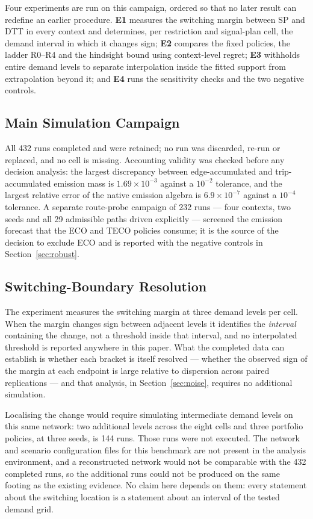 \documentclass[runningheads]{llncs}
\begin{document}
Four experiments are run on this campaign, ordered so that no later result can redefine an
earlier procedure. \textbf{E1} measures the switching margin between SP and DTT in every
context and determines, per restriction and signal-plan cell, the demand interval in which
it changes sign; \textbf{E2} compares the fixed policies, the ladder R0--R4 and the
hindsight bound using context-level regret; \textbf{E3} withholds entire demand levels to
separate interpolation inside the fitted support from extrapolation beyond it; and
\textbf{E4} runs the sensitivity checks and the two negative controls.

\subsection{Main Simulation Campaign}

All 432 runs completed and were retained; no run was discarded, re-run or replaced, and no
cell is missing. Accounting validity was checked before any decision analysis: the largest
discrepancy between edge-accumulated and trip-accumulated emission mass is
$1.69\times10^{-3}$ against a $10^{-2}$ tolerance, and the largest relative error of the
native emission algebra is $6.9\times10^{-7}$ against a $10^{-4}$ tolerance. A separate
route-probe campaign of 232 runs --- four contexts, two seeds and all 29 admissible paths
driven explicitly --- screened the emission forecast that the ECO and TECO policies
consume; it is the source of the decision to exclude ECO and is reported with the negative
controls in Section~\ref{sec:robust}.

\subsection{Switching-Boundary Resolution}
\label{sec:boundary-exp}

The experiment measures the switching margin at three demand levels per cell. When the
margin changes sign between adjacent levels it identifies the \emph{interval} containing
the change, not a threshold inside that interval, and no interpolated threshold is
reported anywhere in this paper. What the completed data can establish is whether each
bracket is itself resolved --- whether the observed sign of the margin at each endpoint is
large relative to dispersion across paired replications --- and that analysis, in
Section~\ref{sec:noise}, requires no additional simulation.

Localising the change would require simulating intermediate demand levels on this same
network: two additional levels across the eight cells and three portfolio policies, at
three seeds, is 144 runs. Those runs were not executed. The network and scenario
configuration files for this benchmark are not present in the analysis environment, and a
reconstructed network would not be comparable with the 432 completed runs, so the
additional runs could not be produced on the same footing as the existing evidence. No
claim here depends on them: every statement about the switching location is a statement
about an interval of the tested demand grid.
\end{document}
